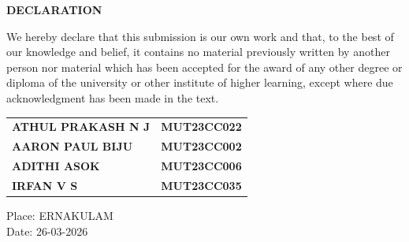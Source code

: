 \documentclass[a4paper,12pt,oneside]{report}
\begin{document}
\begin{titlepage}
{\scshape \centering \Large \bfseries DECLARATION \par}
\vspace{1.5cm}
{We hereby declare that this submission is our own work and that, to the best of our knowledge and belief, it contains no material previously written by another person nor material which has been accepted for the award of any other degree or diploma of the university or other institute of higher learning, except where due acknowledgment has been made in the text.}
\vspace{2cm}
\begin{flushright}
\begin{tabular}{lr}
\textbf{ATHUL PRAKASH N J} & \textbf{MUT23CC022} \\
\textbf{AARON PAUL BIJU} & \textbf{MUT23CC002} \\
\textbf{ADITHI ASOK} & \textbf{MUT23CC006} \\
\textbf{IRFAN V S} & \textbf{MUT23CC035} \\
\end{tabular}
\end{flushright}
\par

\vfill
\noindent Place: ERNAKULAM\\
\noindent Date: 26-03-2026
\end{titlepage}
\end{document}
